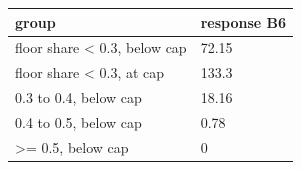\begingroup\small
\setlength{\tabcolsep}{3pt}
\renewcommand{\arraystretch}{1.04}
\begin{tabularx}{\linewidth}{XX}
\toprule
group & response B6 \\
\midrule
floor share \textless{} 0.3, below cap & 72.15 \\
floor share \textless{} 0.3, at cap & 133.3 \\
0.3 to 0.4, below cap & 18.16 \\
0.4 to 0.5, below cap & 0.78 \\
\textgreater{}= 0.5, below cap & 0 \\
\bottomrule
\end{tabularx}
\endgroup
